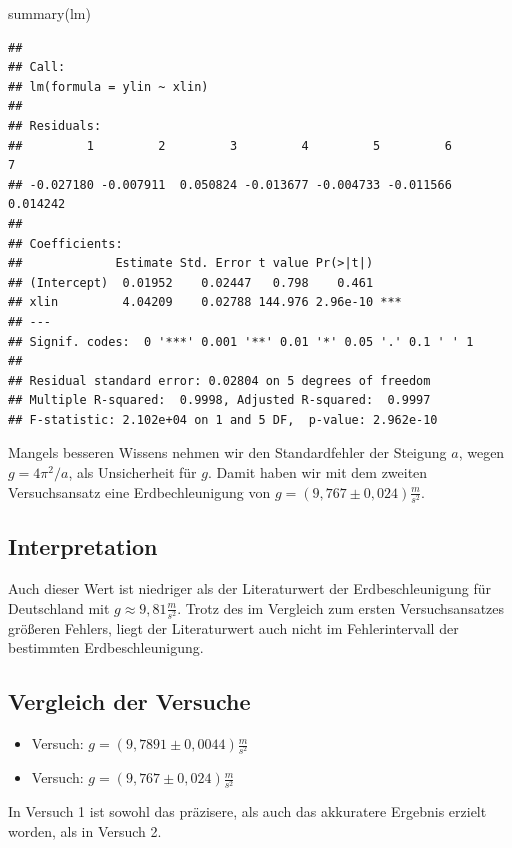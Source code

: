 \documentclass[
  9pt,
]{article}
\newenvironment{Shaded}{\begin{snugshade}}{\end{snugshade}}
\newcommand{\FunctionTok}[1]{\textcolor[rgb]{0.00,0.00,0.00}{#1}}
\newcommand{\NormalTok}[1]{#1}
\begin{document}
\begin{Shaded}
\begin{Highlighting}[]
\FunctionTok{summary}\NormalTok{(lm)}
\end{Highlighting}
\end{Shaded}

\begin{verbatim}
## 
## Call:
## lm(formula = ylin ~ xlin)
## 
## Residuals:
##         1         2         3         4         5         6         7 
## -0.027180 -0.007911  0.050824 -0.013677 -0.004733 -0.011566  0.014242 
## 
## Coefficients:
##             Estimate Std. Error t value Pr(>|t|)    
## (Intercept)  0.01952    0.02447   0.798    0.461    
## xlin         4.04209    0.02788 144.976 2.96e-10 ***
## ---
## Signif. codes:  0 '***' 0.001 '**' 0.01 '*' 0.05 '.' 0.1 ' ' 1
## 
## Residual standard error: 0.02804 on 5 degrees of freedom
## Multiple R-squared:  0.9998, Adjusted R-squared:  0.9997 
## F-statistic: 2.102e+04 on 1 and 5 DF,  p-value: 2.962e-10
\end{verbatim}

Mangels besseren Wissens nehmen wir den Standardfehler der Steigung
\(a\), wegen \(g=4\pi^2/a\), als Unsicherheit für \(g\). Damit haben wir
mit dem zweiten Versuchsansatz eine Erdbechleunigung von
\(g=(9,767 \pm 0,024)\frac{m}{s^2}\).

\hypertarget{interpretation-1}{%
\subsection{Interpretation}\label{interpretation-1}}

Auch dieser Wert ist niedriger als der Literaturwert der
Erdbeschleunigung für Deutschland mit \(g\approx 9,81 \frac{m}{s^2}\).
Trotz des im Vergleich zum ersten Versuchsansatzes größeren Fehlers,
liegt der Literaturwert auch nicht im Fehlerintervall der bestimmten
Erdbeschleunigung.

\hypertarget{vergleich-der-versuche}{%
\subsection{Vergleich der Versuche}\label{vergleich-der-versuche}}

\begin{itemize} 
  \item Versuch: $g=(9,7891 \pm 0,0044)\frac{m}{s^2}$
  \item Versuch: $g=(9,767 \pm 0,024)\frac{m}{s^2}$
\end{itemize}

In Versuch 1 ist sowohl das präzisere, als auch das akkuratere Ergebnis
erzielt worden, als in Versuch 2.
\end{document}
